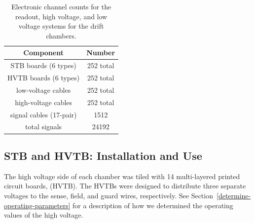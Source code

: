 \begin{table}[htbp]
\begin{center}
\begin{tabular} {||c|c||} \hline \hline
{\bf Component}           & {\bf Number} \\ \hline
STB boards (6 types)      & 252 total \\ \hline
HVTB boards (6 types)     & 252 total \\ \hline
low-voltage cables        & 252 total  \\ \hline
high-voltage cables       & 252 total  \\ \hline
signal cables (17-pair)   & 1512 \\ \hline
total signals             & 24192 \\ \hline \hline
\end{tabular}
\caption{\small{Electronic channel counts for the readout, high voltage,
and low voltage systems for the drift chambers.}}
\label{electronic-components}
\end{center}
\end{table}

\subsection{STB and HVTB: Installation and Use}
\label{stb-hvtb-installation}

The high voltage side of each chamber was tiled with 14  multi-layered printed circuit 
boards, (HVTB). The HVTBs were designed to distribute three
separate voltages to the sense, field, and guard wires, respectively.  See
Section~\ref{determine-operating-parameters} for a 
description of how we determined the operating values of the high voltage.

